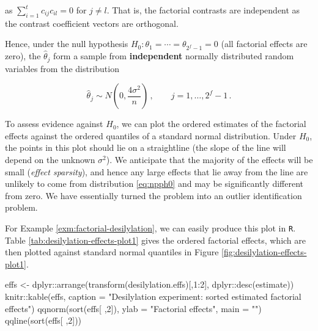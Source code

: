 \documentclass[
]{book}
\newenvironment{Shaded}{\begin{snugshade}}{\end{snugshade}}
\newcommand{\AttributeTok}[1]{\textcolor[rgb]{0.77,0.63,0.00}{#1}}
\newcommand{\DecValTok}[1]{\textcolor[rgb]{0.00,0.00,0.81}{#1}}
\newcommand{\FunctionTok}[1]{\textcolor[rgb]{0.00,0.00,0.00}{#1}}
\newcommand{\NormalTok}[1]{#1}
\newcommand{\OtherTok}[1]{\textcolor[rgb]{0.56,0.35,0.01}{#1}}
\newcommand{\SpecialCharTok}[1]{\textcolor[rgb]{0.00,0.00,0.00}{#1}}
\newcommand{\StringTok}[1]{\textcolor[rgb]{0.31,0.60,0.02}{#1}}
\theoremstyle{definition}
\theoremstyle{definition}
\theoremstyle{definition}
\theoremstyle{definition}
\theoremstyle{remark}
\begin{document}
as \(\sum_{i=1}^tc_{ij}c_{il} = 0\) for \(j\ne l\). That is, the factorial contrasts are independent as the contrast coefficient vectors are orthogonal.

Hence, under the null hypothesis \(H_0: \theta_1 = \cdots = \theta_{2^f-1} = 0\) (all factorial effects are zero), the \(\hat{\theta}_j\) form a sample from \textbf{independent} normally distributed random variables from the distribution

\begin{equation}
\hat{\theta}_j \sim N\left(0, \frac{4\sigma^2}{n}\right)\,,\qquad j = 1, \ldots, 2^f-1\,.
\label{eq:npph0}
\end{equation}

To assess evidence against \(H_0\), we can plot the ordered estimates of the factorial effects against the ordered quantiles of a standard normal distribution. Under \(H_0\), the points in this plot should lie on a straightline (the slope of the line will depend on the unknown \(\sigma^2\)). We anticipate that the majority of the effects will be small (\emph{effect sparsity}), and hence any large effects that lie away from the line are unlikely to come from distribution \eqref{eq:npph0} and may be significantly different from zero. We have essentially turned the problem into an outlier identification problem.

For Example \ref{exm:factorial-desilylation}, we can easily produce this plot in \texttt{R}. Table \ref{tab:desilylation-effects-plot1} gives the ordered factorial effects, which are then plotted against standard normal quantiles in Figure \ref{fig:desilylation-effects-plot1}.

\begin{Shaded}
\begin{Highlighting}[]
\NormalTok{effs }\OtherTok{\textless{}{-}}\NormalTok{ dplyr}\SpecialCharTok{::}\FunctionTok{arrange}\NormalTok{(}\FunctionTok{transform}\NormalTok{(desilylation.effs)[,}\DecValTok{1}\SpecialCharTok{:}\DecValTok{2}\NormalTok{], dplyr}\SpecialCharTok{::}\FunctionTok{desc}\NormalTok{(estimate))}
\NormalTok{knitr}\SpecialCharTok{::}\FunctionTok{kable}\NormalTok{(effs, }\AttributeTok{caption =} \StringTok{"Desilylation experiment: sorted estimated factorial effects"}\NormalTok{)}
\FunctionTok{qqnorm}\NormalTok{(}\FunctionTok{sort}\NormalTok{(effs[ ,}\DecValTok{2}\NormalTok{]), }\AttributeTok{ylab =} \StringTok{"Factorial effects"}\NormalTok{, }\AttributeTok{main =} \StringTok{""}\NormalTok{)}
\FunctionTok{qqline}\NormalTok{(}\FunctionTok{sort}\NormalTok{(effs[ ,}\DecValTok{2}\NormalTok{]))}
\end{Highlighting}
\end{Shaded}
\end{document}
